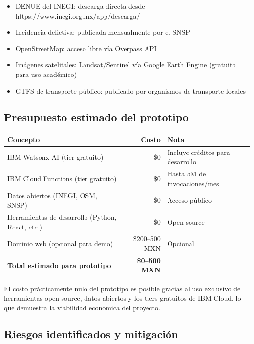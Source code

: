\documentclass[12pt,a4paper]{article}
\begin{document}
\begin{itemize}[leftmargin=1.5cm]
    \item DENUE del INEGI: descarga directa desde \url{https://www.inegi.org.mx/app/descarga/}
    \item Incidencia delictiva: publicada mensualmente por el SNSP
    \item OpenStreetMap: acceso libre vía Overpass API
    \item Imágenes satelitales: Landsat/Sentinel vía Google Earth Engine (gratuito para uso académico)
    \item GTFS de transporte público: publicado por organismos de transporte locales
\end{itemize}

\subsection{Presupuesto estimado del prototipo}

\begin{table}[H]
\centering
\small
\begin{tabularx}{\textwidth}{X r l}
\toprule
\textbf{Concepto} & \textbf{Costo} & \textbf{Nota} \\
\midrule
IBM Watsonx AI (tier gratuito) & \$0 & Incluye créditos para desarrollo \\
IBM Cloud Functions (tier gratuito) & \$0 & Hasta 5M de invocaciones/mes \\
Datos abiertos (INEGI, OSM, SNSP) & \$0 & Acceso público \\
Herramientas de desarrollo (Python, React, etc.) & \$0 & Open source \\
Dominio web (opcional para demo) & \$200--500 MXN & Opcional \\
\midrule
\textbf{Total estimado para prototipo} & \textbf{\$0--500 MXN} & \\
\bottomrule
\end{tabularx}
\end{table}

El costo prácticamente nulo del prototipo es posible gracias al uso exclusivo de herramientas open source, datos abiertos y los tiers gratuitos de IBM Cloud, lo que demuestra la viabilidad económica del proyecto.

\subsection{Riesgos identificados y mitigación}
\end{document}
